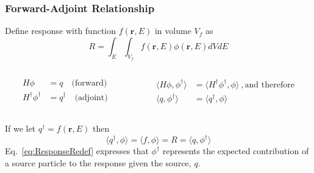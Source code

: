 \documentclass[handout]{beamer}
\renewcommand{\(}{\begin{columns}}
\renewcommand{\)}{\end{columns}}
\newcommand{\<}[1]{\begin{column}{#1}}
\renewcommand{\>}{\end{column}}
\newcommand{\ve}[1]{\ensuremath{\mathbf{#1}}}
\begin{document}
\begin{frame}[fragile]
  \frametitle{Forward-Adjoint Relationship \cite{Wagner2007}}
Define response with function $f(\ve{r}, E)$ in volume $V_f$ as
%
\begin{equation}
 R = \int_E \int_{V_f} f(\ve{r}, E) \phi(\ve{r}, E) dV dE 
 \label{eq:Response}
\end{equation}
%
\begin{columns}
  \begin{column}{0.5\textwidth}
	\begin{align}
  	H\phi &= q \quad \text{(forward)}\nonumber \\
  	H^{\dagger} \phi^{\dagger} &= q^{\dagger} \quad 
  	\text{(adjoint)}\nonumber
  	\end{align}
  \end{column}
  \begin{column}{0.5\textwidth}
  	\begin{align}
  	\langle H\phi, \phi^{\dagger} \rangle &= \langle H^{\dagger} \phi^{\dagger}, \phi \rangle \:, \text{and therefore} \nonumber \\
  	\langle q, \phi^{\dagger} \rangle &= \langle q^{\dagger}, \phi \rangle \nonumber
  	\end{align}
  \end{column}
\end{columns}
\vspace*{1 em}
If we let $q^{\dagger} = f(\ve{r}, E)$ then
%
\begin{equation}
 \langle q^{\dagger}, \phi \rangle = \langle f, \phi \rangle = R = \langle q, \phi^{\dagger} \rangle
 \label{eq:ResponseRedef}
\end{equation}
%
Eq.\ \eqref{eq:ResponseRedef} expresses that $\phi^{\dagger}$ represents the expected contribution of a source particle to the response given the source, $q$.

\end{frame}
\end{document}
